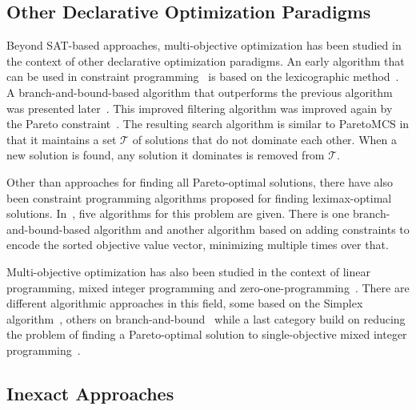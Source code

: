 \subsection{Other Declarative Optimization Paradigms\label{sec:other-approaches}}

Beyond SAT-based approaches, multi-objective optimization has been studied in the context of other declarative optimization paradigms.
An early algorithm that can be used in constraint programming~\autocite{DBLP:reference/fai/2} is based on the lexicographic method~\autocite{Wassenhove1980}.
A branch-and-bound-based algorithm that outperforms the previous algorithm was presented later~\autocite{DBLP:conf/ecai/Gavanelli02}.
This improved filtering algorithm was improved again by the Pareto constraint~\autocite{DBLP:conf/cp/SchausH13,DBLP:conf/aaai/HartertS14}.
The resulting search algorithm is similar to ParetoMCS in that it maintains a set $\mathcal{T}$ of solutions that do not dominate each other.
When a new solution is found, any solution it dominates is removed from $\mathcal{T}$.

Other than approaches for finding all Pareto-optimal solutions, there have also been constraint programming algorithms proposed for finding leximax-optimal solutions.
In~\autocite{DBLP:journals/ai/BouveretL09}, five algorithms for this problem are given.
There is one branch-and-bound-based algorithm and another algorithm based on adding constraints to encode the sorted objective value vector, minimizing multiple times over that.

Multi-objective optimization has also been studied in the context of linear programming, mixed integer programming and zero-one-programming~\autocites{Ehrgott2005-6,Rasmussen1986,DBLP:journals/eor/AlvesC07}.
There are different algorithmic approaches in this field, some based on the Simplex algorithm~\autocites{Ehrgott2005-7,DBLP:journals/mp/EvansS73}, others on branch-and-bound~\autocites{Adelgren2021,DBLP:journals/siamjo/SantisENR20} while a last category build on reducing the problem of finding a Pareto-optimal solution to single-objective mixed integer programming~\autocites{DBLP:journals/jota/Sun17,DBLP:journals/ol/LuMS20,Soland1979}.

\subsection{Inexact Approaches\label{sec:approximative}}

